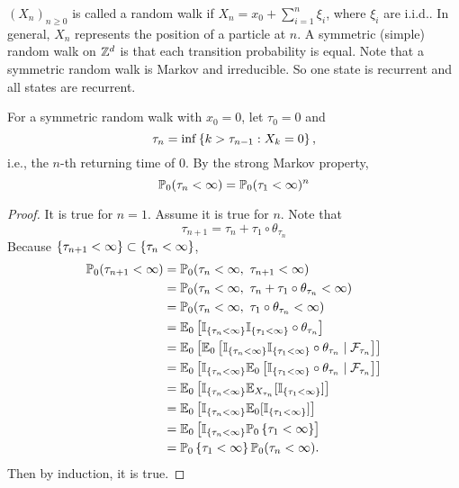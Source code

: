 \begin{exam}
    $(X_n)_{n \geq 0}$ is called a random walk if $X_n = x_0 + \sum_{i=1}^n \xi_i$, where $\xi_i$ are i.i.d.. In general, $X_n$ represents the position of a particle at $n$. A symmetric (simple) random walk on $\mathbb{Z}^d$ is that each transition probability is equal. Note that a symmetric random walk is Markov and irreducible. So one state is recurrent and all states are recurrent. 

    \noindent For a symmetric random walk with $x_0 = 0$, let $\tau_0 = 0$ and
    \begin{equation*}
        \tau_n = \inf \left\{k > \tau_{n-1}: X_k = 0\right\},
    \end{equation*}
    i.e., the $n$-th returning time of $0$. By the strong Markov property,
    \begin{equation*}
        \mathbb{P}_0(\tau_n < \infty) = \mathbb{P}_0(\tau_1 < \infty)^n
    \end{equation*}
    \begin{proof}
        It is true for $n = 1$. Assume it is true for $n$. Note that
        \begin{equation*}
            \tau_{n+1} = \tau_n + \tau_1 \circ \theta_{\tau_n}
        \end{equation*}
        Because $\left\{\tau_{n+1} < \infty\right\} \subset \left\{\tau_n < \infty\right\}$,
        \begin{equation*}
            \begin{aligned}
                \mathbb{P}_0(\tau_{n+1} < \infty) &= \mathbb{P}_0(\tau_n < \infty,~\tau_{n+1} < \infty)\\
                &= \mathbb{P}_0(\tau_n < \infty,~\tau_n + \tau_1 \circ \theta_{\tau_n} < \infty) \\
                &= \mathbb{P}_0(\tau_n < \infty,~\tau_1 \circ \theta_{\tau_n} < \infty) \\
                &= \mathbb{E}_0\left[\mathbb{I}_{\left\{\tau_n < \infty\right\}}\mathbb{I}_{\left\{\tau_1 < \infty\right\}} \circ \theta_{\tau_n}\right]\\
                &= \mathbb{E}_0\left[\mathbb{E}_0\left[\mathbb{I}_{\left\{\tau_n < \infty\right\}}\mathbb{I}_{\left\{\tau_1 < \infty\right\}} \circ \theta_{\tau_n} \mid \mathcal{F}_{\tau_n}\right]\right] \\
                &= \mathbb{E}_0\left[\mathbb{I}_{\left\{\tau_n < \infty\right\}}\mathbb{E}_0\left[\mathbb{I}_{\left\{\tau_1 < \infty\right\}} \circ \theta_{\tau_n} \mid \mathcal{F}_{\tau_n}\right]\right] \\
                &= \mathbb{E}_0\left[\mathbb{I}_{\left\{\tau_n < \infty\right\}}\mathbb{E}_{X_{\tau_n}}[\mathbb{I}_{\left\{\tau_1 < \infty\right\}}]\right] \\
                &= \mathbb{E}_0\left[\mathbb{I}_{\left\{\tau_n < \infty\right\}}\mathbb{E}_0[\mathbb{I}_{\left\{\tau_1 < \infty\right\}}]\right] \\
                &= \mathbb{E}_0\left[\mathbb{I}_{\left\{\tau_n < \infty\right\}}\mathbb{P}_0\left\{\tau_1 < \infty\right\}\right] \\
                &= \mathbb{P}_0\left\{\tau_1 < \infty\right\}\mathbb{P}_0(\tau_n < \infty).
            \end{aligned}
        \end{equation*}
        Then by induction, it is true.
    \end{proof}
    

\end{exam}

